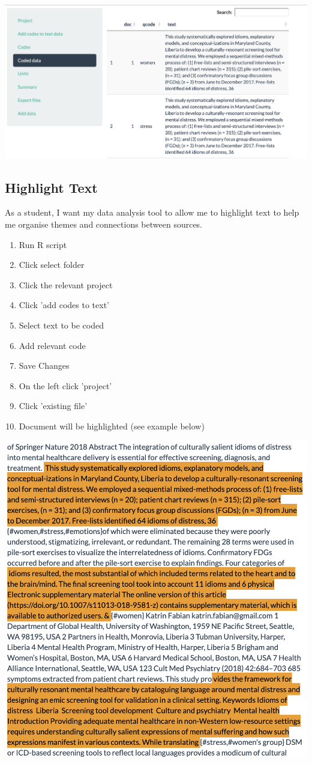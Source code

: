 \documentclass{article}
\begin{document}
\includegraphics[width=\textwidth]{coded-data.png}


\subsection{Highlight Text}
As a student, I want my data analysis tool to allow me to highlight text to help me organise themes and connections between sources.
\begin{enumerate}
\item Run R script
\item Click select folder 
\item Click the relevant project 
\item Click 'add codes to text'
\item Select text to be coded
\item Add relevant code
\item Save Changes 
\item On the left click 'project'
\item Click 'existing file'
\item Document will be highlighted (see example below)
\end{enumerate}

\includegraphics[width=\textwidth]{highlight-text.png}
\end{document}
